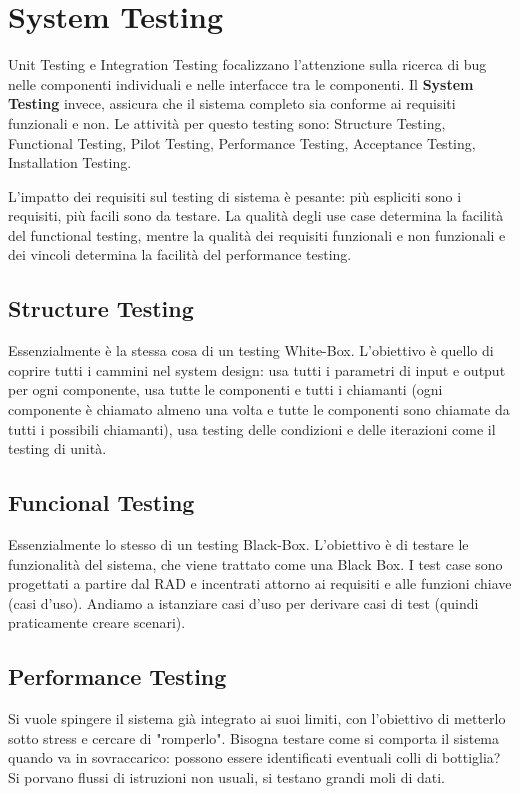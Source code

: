     \section{System Testing}
        Unit Testing e Integration Testing focalizzano l'attenzione sulla ricerca di bug nelle componenti individuali e nelle interfacce tra le componenti. Il \textbf{System Testing} invece, assicura che il sistema completo sia conforme ai requisiti funzionali e non. Le attività per questo testing sono: Structure Testing, Functional Testing, Pilot Testing, Performance Testing, Acceptance Testing, Installation Testing.
        
        L'impatto dei requisiti sul testing di sistema è pesante: più espliciti sono i requisiti, più facili sono da testare. La qualità degli use case determina la facilità del functional testing, mentre la qualità dei requisiti funzionali e non funzionali e dei vincoli determina la facilità del performance testing.
        
        \subsection{Structure Testing}
            Essenzialmente è la stessa cosa di un testing White-Box. L'obiettivo è quello di coprire tutti i cammini nel system design: usa tutti i parametri di input e output per ogni componente, usa tutte le componenti e tutti i chiamanti (ogni componente è chiamato almeno una volta e tutte le componenti sono chiamate da tutti i possibili chiamanti), usa testing delle condizioni e delle iterazioni come il testing di unità.
            
        \subsection{Funcional Testing}
            Essenzialmente lo stesso di un testing Black-Box. L'obiettivo è di testare le funzionalità del sistema, che viene trattato come una Black Box. I test case sono progettati a partire dal RAD e incentrati attorno ai requisiti e alle funzioni chiave (casi d'uso). Andiamo a istanziare casi d'uso per derivare casi di test (quindi praticamente creare scenari).
            
        \subsection{Performance Testing}
            Si vuole spingere il sistema già integrato ai suoi limiti, con l'obiettivo di metterlo sotto stress e cercare di "romperlo". Bisogna testare come si comporta il sistema quando va in sovraccarico: possono essere identificati eventuali colli di bottiglia? Si porvano flussi di istruzioni non usuali, si testano grandi moli di dati.
            
